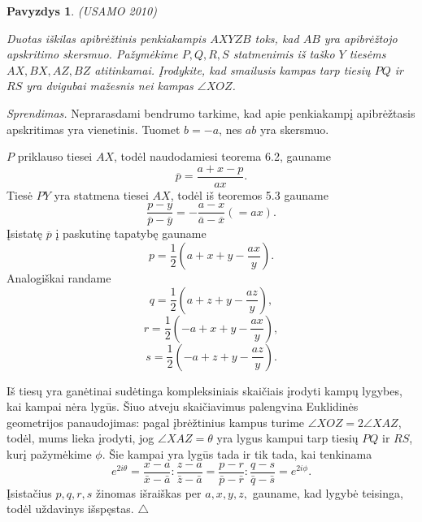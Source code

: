 \documentclass[11pt,a4paper,twoside]{book}
\newenvironment{sprendimas}{\noindent \textit{Sprendimas.}}{\hfill $\triangle$}
\newcounter{foo}[subsection]
\newtheorem{pavnr}[foo]{Pavyzdys}
\theoremstyle{definition} \newtheorem*{api}{Apibrėžimas}
\theoremstyle{remark} \newtheorem*{pastaba}{Pastaba}
\begin{document}
\begin{pavnr}
(USAMO 2010) 

Duotas iškilas apibrėžtinis penkiakampis $AXYZB$ toks, kad $AB$ yra apibrėžtojo apskritimo skersmuo. Pažymėkime $P, Q, R, S$ statmenimis iš taško $Y$ tiesėms  $AX, BX, AZ, BZ$ atitinkamai. Įrodykite, kad smailusis kampas tarp tiesių $PQ$ ir $RS$ yra dvigubai mažesnis nei kampas $\angle XOZ$.
\end{pavnr}
\begin{sprendimas}
  Neprarasdami bendrumo tarkime, kad apie penkiakampį apibrėžtasis apskritimas yra vienetinis. Tuomet $b = -a$, nes $ab$ yra skersmuo. 

$P$ priklauso tiesei $AX$, todėl naudodamiesi teorema 6.2, gauname $$\overline{p}=\frac{a+x-p}{ax}.$$ Tiesė $PY$ yra statmena tiesei $AX$, todėl iš teoremos 5.3 gauname $$\frac{p-y}{\overline{p}-\overline{y}}=-\frac{a-x}{\overline{a}-\overline{x}} (=ax).$$ 
Įsistatę $\overline{p}$ į paskutinę tapatybę gauname 
$$p = \frac {1}{2}( a+x+y- \frac {ax}{y}).$$
Analogiškai randame
$$q = \frac {1}{2}( a+z+y- \frac {az}{y}),$$ 
$$r = \frac {1}{2}( -a+x+y- \frac {ax}{y}),$$
$$s = \frac {1}{2}( -a+z+y- \frac {az}{y}).$$

Iš tiesų yra ganėtinai sudėtinga kompleksiniais skaičiais įrodyti kampų lygybes, kai kampai nėra lygūs. Šiuo atveju skaičiavimus palengvina Euklidinės geometrijos panaudojimas: pagal įbrėžtinius kampus turime $\angle XOZ = 2\angle XAZ$, todėl, mums lieka įrodyti, jog  $\angle XAZ=\theta$ yra lygus kampui tarp tiesių $PQ$ ir $RS$, kurį pažymėkime $\phi$. Šie kampai yra lygūs tada ir tik tada, kai tenkinama 
$$e^{2i\theta}=\frac {x-a} {\bar x - \bar a} : \frac{z-a}{\bar z - \bar a} = \frac{p-r}{\bar p - \bar r} : \frac{q-s}{\bar q - \bar s}=e^{2i\phi}.$$
Įsistačius $p, q, r, s$ žinomas išraiškas per $a, x, y, z,$ gauname, kad lygybė teisinga, todėl uždavinys išspęstas.
\end{sprendimas}
     
\end{document}
